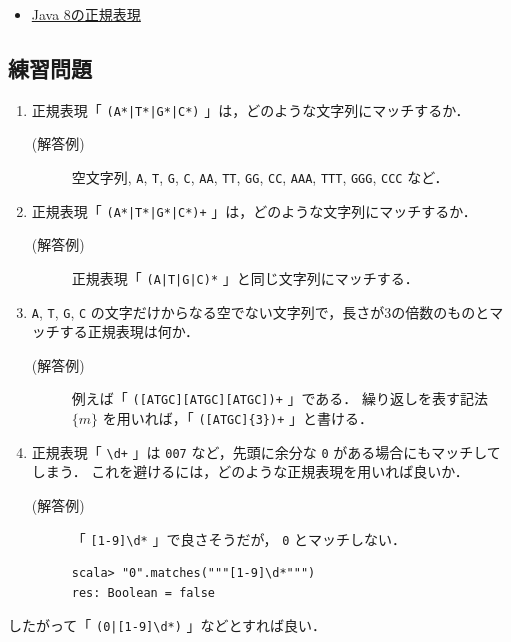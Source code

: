 \documentclass[a4j]{jsarticle}
\begin{document}
\begin{itemize}
\item \href{https://docs.oracle.com/javase/jp/8/docs/api/java/util/regex/Pattern.html}{Java 8の正規表現}
\end{itemize}
\subsection{練習問題}
\label{sec-2-1}

\begin{enumerate}
\item 正規表現「 \texttt{(A*|T*|G*|C*)} 」は，どのような文字列にマッチするか．
\begin{description}
\item[(解答例)] 空文字列, \texttt{A}, \texttt{T}, \texttt{G}, \texttt{C}, \texttt{AA}, \texttt{TT}, \texttt{GG}, \texttt{CC}, \texttt{AAA}, \texttt{TTT}, \texttt{GGG}, \texttt{CCC} など．
\end{description}
\item 正規表現「 \texttt{(A*|T*|G*|C*)+} 」は，どのような文字列にマッチするか．
\begin{description}
\item[(解答例)] 正規表現「 \texttt{(A|T|G|C)*} 」と同じ文字列にマッチする．
\end{description}
\item \texttt{A}, \texttt{T}, \texttt{G}, \texttt{C} の文字だけからなる空でない文字列で，長さが3の倍数のものとマッチする正規表現は何か．
\begin{description}
\item[(解答例)] 例えば「 \texttt{([ATGC][ATGC][ATGC])+} 」である．
       繰り返しを表す記法 $\{m\}$ を用いれば，「 \texttt{([ATGC]\{3\})+} 」と書ける．
\end{description}
\item 正規表現「 \texttt{\textbackslash{}d+} 」は \texttt{007} など，先頭に余分な \texttt{0} がある場合にもマッチしてしまう．
     これを避けるには，どのような正規表現を用いれば良いか．
\begin{description}
\item[(解答例)] 「 \texttt{[1-9]\textbackslash{}d*} 」で良さそうだが， \texttt{0} とマッチしない．

\begin{verbatim}
scala> "0".matches("""[1-9]\d*""")
res: Boolean = false
\end{verbatim}
\end{description}
\end{enumerate}
       したがって「 \texttt{(0|[1-9]\textbackslash{}d*)} 」などとすれば良い．
\end{document}
